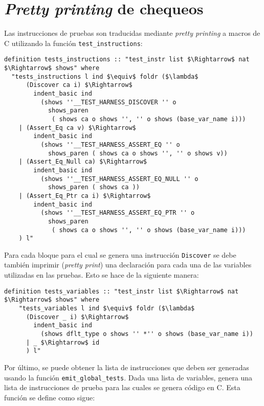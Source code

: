 \chapter{\textit{Pretty printing} de chequeos}
\label{ap:test_harness_c}


Las instrucciones de pruebas son traducidas mediante \textit{pretty printing} a macros de C utilizando la función \verb|test_instructions|:

\begin{lstlisting}[mathescape=true, frame=single]
definition tests_instructions :: "test_instr list $\Rightarrow$ nat $\Rightarrow$ shows" where
  "tests_instructions l ind $\equiv$ foldr ($\lambda$
      (Discover ca i) $\Rightarrow$
        indent_basic ind
          (shows ''__TEST_HARNESS_DISCOVER '' o
            shows_paren
             ( shows ca o shows '', '' o shows (base_var_name i)))
    | (Assert_Eq ca v) $\Rightarrow$
        indent_basic ind
          (shows ''__TEST_HARNESS_ASSERT_EQ '' o
            shows_paren ( shows ca o shows '', '' o shows v))
    | (Assert_Eq_Null ca) $\Rightarrow$
        indent_basic ind
          (shows ''__TEST_HARNESS_ASSERT_EQ_NULL '' o
            shows_paren ( shows ca ))
    | (Assert_Eq_Ptr ca i) $\Rightarrow$
        indent_basic ind
          (shows ''__TEST_HARNESS_ASSERT_EQ_PTR '' o
            shows_paren
             ( shows ca o shows '', '' o shows (base_var_name i)))
    ) l"
\end{lstlisting}


Para cada bloque para el cual se genera una instrucción \verb|Discover| se debe también imprimir (\textit{pretty print}) una declaración para cada una de las variables utilizadas en las pruebas.
Esto se hace de la siguiente manera:

\begin{lstlisting}[mathescape=true, frame=single]
  definition tests_variables :: "test_instr list $\Rightarrow$ nat $\Rightarrow$ shows" where
    "tests_variables l ind $\equiv$ foldr ($\lambda$
      (Discover _ i) $\Rightarrow$
        indent_basic ind
          (shows dflt_type o shows '' *'' o shows (base_var_name i))
      | _ $\Rightarrow$ id
      ) l"
\end{lstlisting}


Por último, se puede obtener la lista de instrucciones que deben ser generadas usando la función \verb|emit_global_tests|.
Dada una lista de variables, genera una lista de instrucciones de prueba para las cuales se genera código en C.
Esta función se define como sigue:


